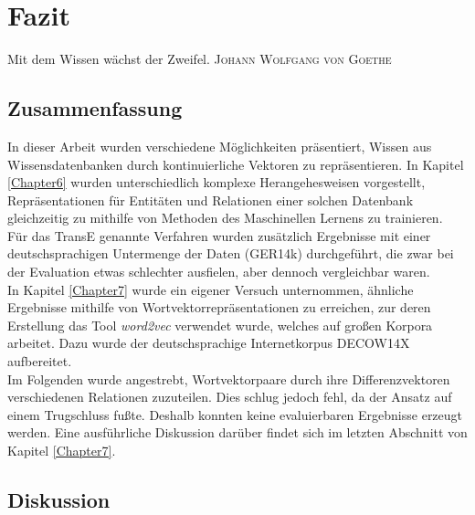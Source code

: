 
\chapter{Fazit} %

\label{Chapter8} %


\begin{itquote}
  Mit dem Wissen wächst der Zweifel.
  \flushright
  \textsc{Johann Wolfgang von Goethe}
\end{itquote}

\section{Zusammenfassung}

In dieser Arbeit wurden verschiedene Möglichkeiten präsentiert, Wissen aus Wissensdatenbanken durch kontinuierliche Vektoren
zu repräsentieren. In Kapitel \ref{Chapter6} wurden unterschiedlich komplexe Herangehesweisen vorgestellt, Repräsentationen
für Entitäten und Relationen einer solchen Datenbank gleichzeitig zu mithilfe von Methoden des Maschinellen Lernens zu trainieren.\\
Für das TransE genannte Verfahren wurden zusätzlich Ergebnisse mit einer deutschsprachigen Untermenge der Daten (GER14k)
durchgeführt, die zwar bei der Evaluation etwas schlechter ausfielen, aber dennoch vergleichbar waren.\\

In Kapitel \ref{Chapter7} wurde ein eigener Versuch unternommen, ähnliche Ergebnisse mithilfe von Wortvektorrepräsentationen
zu erreichen, zur deren Erstellung das Tool \emph{word2vec} verwendet wurde, welches auf großen Korpora arbeitet. Dazu
wurde der deutschsprachige Internetkorpus DECOW14X aufbereitet.\\
Im Folgenden wurde angestrebt, Wortvektorpaare durch ihre Differenzvektoren verschiedenen Relationen zuzuteilen. Dies schlug
jedoch fehl, da der Ansatz auf einem Trugschluss fußte. Deshalb konnten keine evaluierbaren Ergebnisse erzeugt werden.
Eine ausführliche Diskussion darüber findet sich im letzten Abschnitt von Kapitel \ref{Chapter7}.

\section{Diskussion}

